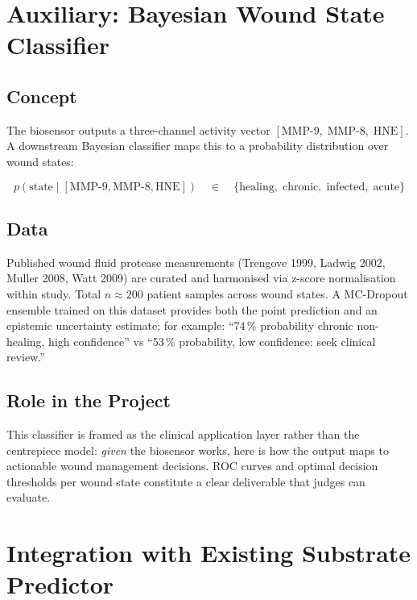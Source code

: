 \documentclass[10pt,a4paper]{article}
\begin{document}
\section{Auxiliary: Bayesian Wound State Classifier}

\subsection{Concept}

The biosensor outputs a three-channel activity vector
$[\text{MMP-9},\; \text{MMP-8},\; \text{HNE}]$.  A downstream
Bayesian classifier maps this to a probability distribution over wound states:

\begin{equation}
  p(\text{state} \mid [\text{MMP-9},\text{MMP-8},\text{HNE}])
  \quad\in\quad
  \{\text{healing},\;\text{chronic},\;\text{infected},\;\text{acute}\}
\end{equation}

\subsection{Data}

Published wound fluid protease measurements (Trengove 1999, Ladwig 2002,
Muller 2008, Watt 2009) are curated and harmonised via z-score
normalisation within study.  Total $n \approx 200$ patient samples
across wound states.  A MC-Dropout ensemble trained on this dataset
provides both the point prediction and an epistemic uncertainty estimate;
for example: ``74\,\% probability chronic non-healing, high
confidence'' vs ``53\,\% probability, low confidence: seek clinical review.''

\subsection{Role in the Project}

This classifier is framed as the clinical application layer rather than
the centrepiece model: \emph{given} the biosensor works, here is how the
output maps to actionable wound management decisions.  ROC curves and
optimal decision thresholds per wound state constitute a clear deliverable
that judges can evaluate.

\section{Integration with Existing Substrate Predictor}
\end{document}
